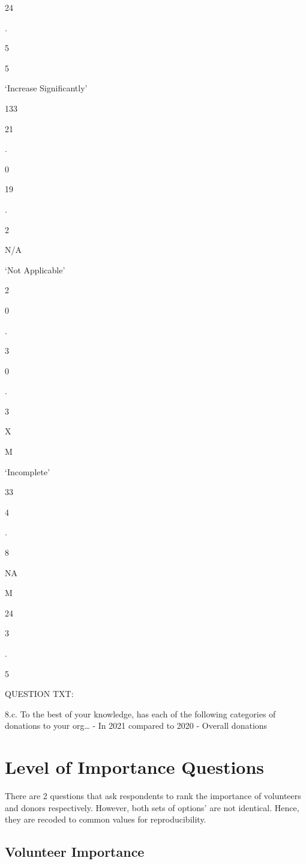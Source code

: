 \documentclass[
  letterpaper,
]{scrbook}
\begin{document}
24

.

5

5

`Increase Significantly'

133

21

.

0

19

.

2

N/A

`Not Applicable'

2

0

.

3

0

.

3

X

M

`Incomplete'

33

4

.

8

NA

M

24

3

.

5

QUESTION TXT:

8.c. To the best of your knowledge, has each of the following categories
of donations to your org\ldots{} - In 2021 compared to 2020 - Overall
donations

\chapter{Level of Importance
Questions}\label{level-of-importance-questions}

There are 2 questions that ask respondents to rank the importance of
volunteers and donors respectively. However, both sets of options' are
not identical. Hence, they are recoded to common values for
reproducibility.

\section{Volunteer Importance}\label{volunteer-importance}
\end{document}
